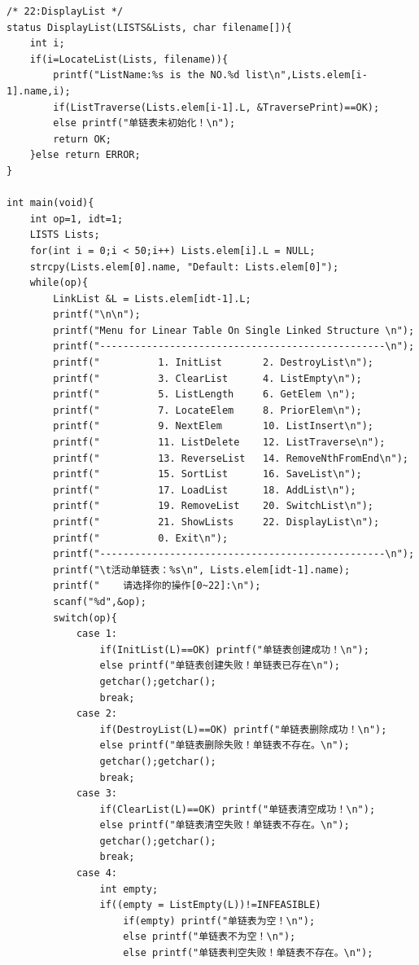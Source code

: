 \documentclass[supercite]{Experimental_Report}
\theoremstyle{definition}
\begin{document}
\begin{lstlisting}
/* 22:DisplayList */
status DisplayList(LISTS&Lists, char filename[]){
    int i;
    if(i=LocateList(Lists, filename)){
        printf("ListName:%s is the NO.%d list\n",Lists.elem[i-1].name,i);
        if(ListTraverse(Lists.elem[i-1].L, &TraversePrint)==OK);
        else printf("单链表未初始化！\n");
        return OK;
    }else return ERROR;
}

int main(void){
    int op=1, idt=1;
    LISTS Lists;
    for(int i = 0;i < 50;i++) Lists.elem[i].L = NULL;
    strcpy(Lists.elem[0].name, "Default: Lists.elem[0]");
    while(op){
        LinkList &L = Lists.elem[idt-1].L;
        printf("\n\n");
        printf("Menu for Linear Table On Single Linked Structure \n");
        printf("-------------------------------------------------\n");
        printf("          1. InitList       2. DestroyList\n");
        printf("          3. ClearList      4. ListEmpty\n");
        printf("          5. ListLength     6. GetElem \n");
        printf("          7. LocateElem     8. PriorElem\n");
        printf("          9. NextElem       10. ListInsert\n");
        printf("          11. ListDelete    12. ListTraverse\n");
        printf("          13. ReverseList   14. RemoveNthFromEnd\n");
        printf("          15. SortList      16. SaveList\n");
        printf("          17. LoadList      18. AddList\n");
        printf("          19. RemoveList    20. SwitchList\n");
        printf("          21. ShowLists     22. DisplayList\n");
        printf("          0. Exit\n");
        printf("-------------------------------------------------\n");
        printf("\t活动单链表：%s\n", Lists.elem[idt-1].name);
        printf("    请选择你的操作[0~22]:\n");
        scanf("%d",&op);
        switch(op){
            case 1:
                if(InitList(L)==OK) printf("单链表创建成功！\n");
                else printf("单链表创建失败！单链表已存在\n");
                getchar();getchar();
                break;
            case 2:
                if(DestroyList(L)==OK) printf("单链表删除成功！\n");
                else printf("单链表删除失败！单链表不存在。\n");
                getchar();getchar();
                break;
            case 3:
                if(ClearList(L)==OK) printf("单链表清空成功！\n");
                else printf("单链表清空失败！单链表不存在。\n");
                getchar();getchar();
                break;
            case 4:
                int empty;
                if((empty = ListEmpty(L))!=INFEASIBLE)
                    if(empty) printf("单链表为空！\n");
                    else printf("单链表不为空！\n");
                    else printf("单链表判空失败！单链表不存在。\n");

\end{lstlisting}
\end{document}
